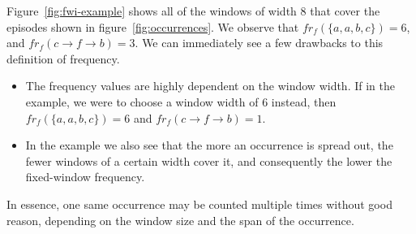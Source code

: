 Figure~\ref{fig:fwi-example} shows all of the windows of width 8 that cover the episodes shown in figure~\ref{fig:occurrences}. We observe that $ fr_f(\{ a, a, b, c \}) = 6 $, and $ fr_f(c \to f \to b) = 3 $. We can immediately see a few drawbacks to this definition of frequency.

\begin{itemize}
\item The frequency values are highly dependent on the window width. If in the example, we were to choose a window width of $ 6 $ instead, then $ fr_f(\{ a, a, b, c \}) = 6 $ and $ fr_f(c \to f \to b) = 1 $.
\item In the example we also see that the more an occurrence is spread out, the fewer windows of a certain width cover it, and consequently the lower the fixed-window frequency.
\end{itemize}

In essence, one same occurrence may be counted multiple times without good reason, depending on the window size and the span of the occurrence.


